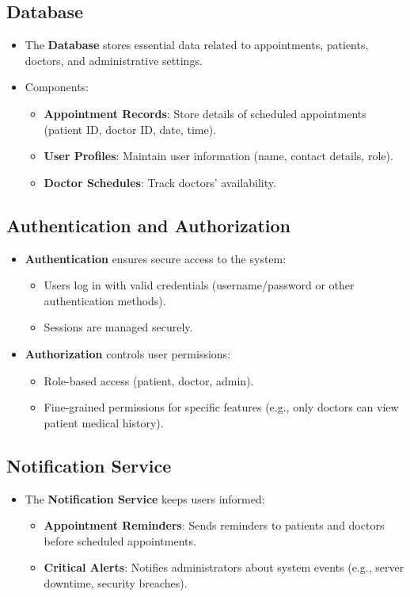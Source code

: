 \documentclass[a4paper, 12pt]{article}
\begin{document}
\subsection{Database}
\begin{itemize}
    \item The \textbf{Database} stores essential data related to appointments, patients, doctors, and administrative settings.
    \item Components:
    \begin{itemize}
        \item \textbf{Appointment Records}: Store details of scheduled appointments (patient ID, doctor ID, date, time).
        \item \textbf{User Profiles}: Maintain user information (name, contact details, role).
        \item \textbf{Doctor Schedules}: Track doctors' availability.
    \end{itemize}
\end{itemize}

\subsection{Authentication and Authorization}
\begin{itemize}
    \item \textbf{Authentication} ensures secure access to the system:
    \begin{itemize}
        \item Users log in with valid credentials (username/password or other authentication methods).
        \item Sessions are managed securely.
    \end{itemize}
    \item \textbf{Authorization} controls user permissions:
    \begin{itemize}
        \item Role-based access (patient, doctor, admin).
        \item Fine-grained permissions for specific features (e.g., only doctors can view patient medical history).
    \end{itemize}
\end{itemize}

\subsection{Notification Service}
\begin{itemize}
    \item The \textbf{Notification Service} keeps users informed:
    \begin{itemize}
        \item \textbf{Appointment Reminders}: Sends reminders to patients and doctors before scheduled appointments.
        \item \textbf{Critical Alerts}: Notifies administrators about system events (e.g., server downtime, security breaches).
    \end{itemize}
\end{itemize}
\end{document}
